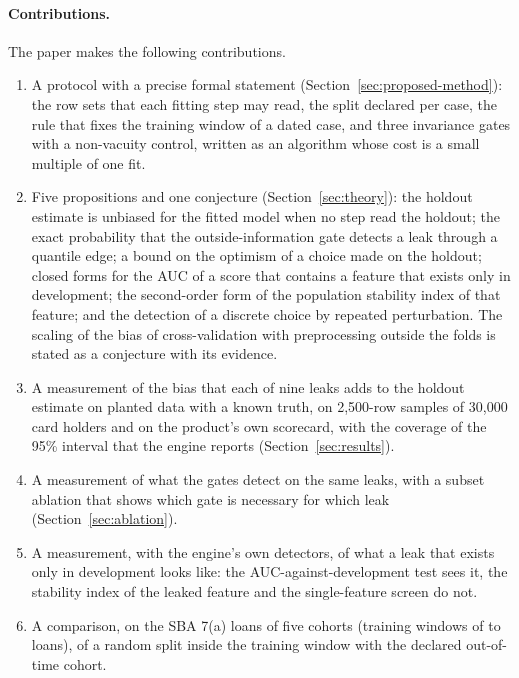 \paragraph{Contributions.} The paper makes the following contributions.
\begin{enumerate}
\item A protocol with a precise formal statement (Section~\ref{sec:proposed-method}): the row sets that each fitting step may read, the split declared per case, the rule that fixes the training window of a dated case, and three invariance gates with a non-vacuity control, written as an algorithm whose cost is a small multiple of one fit.
\item Five propositions and one conjecture (Section~\ref{sec:theory}): the holdout estimate is unbiased for the fitted model when no step read the holdout; the exact probability that the outside-information gate detects a leak through a quantile edge; a bound on the optimism of a choice made on the holdout; closed forms for the AUC of a score that contains a feature that exists only in development; the second-order form of the population stability index of that feature; and the detection of a discrete choice by repeated perturbation. The scaling of the bias of cross-validation with preprocessing outside the folds is stated as a conjecture with its evidence.
\item A measurement of the bias that each of nine leaks adds to the holdout estimate on planted data with a known truth, on 2,500-row samples of 30,000 card holders and on the product's own scorecard, with the coverage of the 95\% interval that the engine reports (Section~\ref{sec:results}).
\item A measurement of what the gates detect on the same leaks, with a subset ablation that shows which gate is necessary for which leak (Section~\ref{sec:ablation}).
\item A measurement, with the engine's own detectors, of what a leak that exists only in development looks like: the AUC-against-development test sees it, the stability index of the leaked feature and the single-feature screen do not.
\item A comparison, on the SBA 7(a) loans of five cohorts (training windows of  to  loans), of a random split inside the training window with the declared out-of-time cohort.
\end{enumerate}

